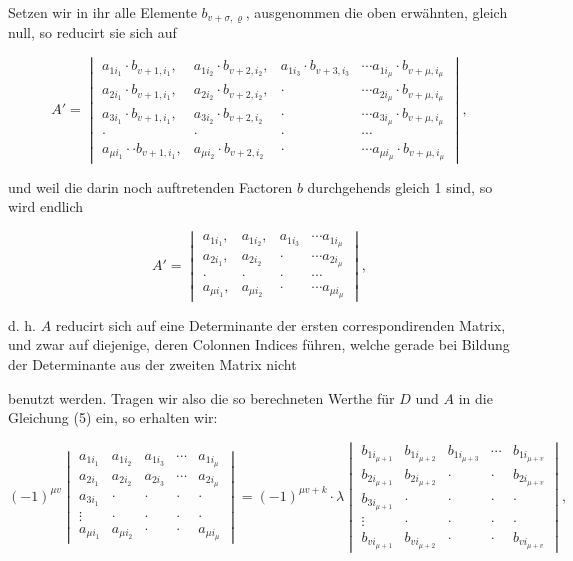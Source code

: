 \documentclass[11pt]{article}
\providecommand{\weberpage}[1]{}
\providecommand{\weq}[2]{\begin{equation}\tag{#1}#2\end{equation}}
\begin{document}
Setzen wir in ihr alle Elemente $b_{v+\sigma,\varrho}$, ausgenommen die oben erw\"ahnten, gleich null, so reducirt sie sich auf

\[
A' =
\begin{vmatrix}
a_{1i_1}\cdot b_{v+1,i_1}, & a_{1i_2}\cdot b_{v+2,i_2}, & a_{1i_3}\cdot b_{v+3,i_3} & \cdots a_{1i_\mu}\cdot b_{v+\mu,i_\mu} \\
a_{2i_1}\cdot b_{v+1,i_1}, & a_{2i_2}\cdot b_{v+2,i_2}, & \cdot & \cdots a_{2i_\mu}\cdot b_{v+\mu,i_\mu} \\
a_{3i_1}\cdot b_{v+1,i_1}, & a_{3i_2}\cdot b_{v+2,i_2} & \cdot & \cdots a_{3i_\mu}\cdot b_{v+\mu,i_\mu} \\
\cdot & \cdot & \cdot & \cdots \\
a_{\mu i_1}\cdot\cdot b_{v+1,i_1}, & a_{\mu i_2}\cdot b_{v+2,i_2} & \cdot & \cdots a_{\mu i_\mu}\cdot b_{v+\mu,i_\mu}
\end{vmatrix},
\]

und weil die darin noch auftretenden Factoren $b$ durchgehends gleich 1 sind, so wird endlich

\[
A' =
\begin{vmatrix}
a_{1i_1}, & a_{1i_2}, & a_{1i_3} & \cdots a_{1i_\mu} \\
a_{2i_1}, & a_{2i_2} & \cdot & \cdots a_{2i_\mu} \\
\cdot & \cdot & \cdot & \cdots \\
a_{\mu i_1}, & a_{\mu i_2} & \cdot & \cdots a_{\mu i_\mu}
\end{vmatrix},
\]

d. h. $A$ reducirt sich auf eine Determinante der ersten correspondirenden Matrix, und zwar auf diejenige, deren Colonnen Indices f\"uhren, welche gerade bei Bildung der Determinante aus der zweiten Matrix nicht


\weberpage{99}
benutzt werden. Tragen wir also die so berechneten Werthe f\"ur $D$ und $A$ in die Gleichung (5) ein, so erhalten wir:

\weq{6}{(-1)^{\mu v}
\begin{vmatrix}
a_{1i_1} & a_{1i_2} & a_{1i_3} & \cdots & a_{1i_\mu} \\
a_{2i_1} & a_{2i_2} & a_{2i_3} & \cdots & a_{2i_\mu} \\
a_{3i_1} & \cdot & \cdot & \cdot & \cdot \\
\vdots & \cdot & \cdot & \cdot & \cdot \\
a_{\mu i_1} & a_{\mu i_2} & \cdot & \cdot & a_{\mu i_\mu}
\end{vmatrix}
= (-1)^{\mu v + k}\cdot\lambda
\begin{vmatrix}
b_{1 i_{\mu+1}} & b_{1 i_{\mu+2}} & b_{1 i_{\mu+3}} & \cdots & b_{1 i_{\mu+v}} \\
b_{2 i_{\mu+1}} & b_{2 i_{\mu+2}} & \cdot & \cdot & b_{2 i_{\mu+v}} \\
b_{3 i_{\mu+1}} & \cdot & \cdot & \cdot & \cdot \\
\vdots & \cdot & \cdot & \cdot & \cdot \\
b_{v i_{\mu+1}} & b_{v i_{\mu+2}} & \cdot & \cdot & b_{v i_{\mu+v}}
\end{vmatrix},}
\end{document}
